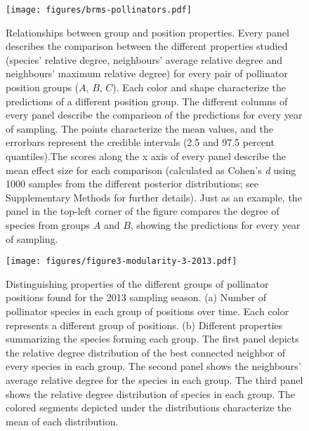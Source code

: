 \documentclass[11pt, a4paper]{article}
\begin{document}
\begin{figure}[ht]
  \centering
    \vspace{0.5cm}
    \texttt{[image: figures/brms-pollinators.pdf]}
        \vspace{0.3cm}
	   \caption[Relationships between group and position properties]{Relationships between group and position properties. Every panel describes the comparison between the different properties studied (species' relative degree, neighbours' average relative degree and neighbours' maximum relative degree) for every pair of pollinator position groups ($A$, $B$, $C$). Each color and shape characterize the predictions of a different position group. The different columns of every panel describe the comparison of the predictions for every year of sampling. The points characterize the mean values, and the errorbars represent the credible intervals (2.5 and 97.5 percent quantiles).The scores along the x axis of every panel describe the mean effect size for each comparison (calculated as Cohen's \textit{d} using 1000 samples from the different posterior distributions; see Supplementary Methods for further details). Just as an example, the panel in the top-left corner of the figure compares the degree of species from groups $A$ and $B$, showing the predictions for every year of sampling.}
      \label{sfig:multivariate}
\end{figure}


\clearpage

\begin{figure}[p]
  \centering
    \vspace{0.5cm}
    \texttt{[image: figures/figure3-modularity-3-2013.pdf]}
	  \vspace{0.3cm}
	   \caption[Distinguishing properties of the different groups of pollinator positions found for the 2013 sampling season]{Distinguishing properties of the different groups of pollinator positions found for the 2013 sampling season. (a) Number of pollinator species in each group of positions over time. Each color represents a different group of positions. (b) Different properties summarizing the species forming each group. The first panel depicts the relative degree distribution of the best connected neighbor of every species in each group. The second panel shows the neighbours' average relative degree for the species in each group. The third panel shows the relative degree distribution of species in each group. The colored segments depicted under the distributions characterize the mean of each distribution.}
      \label{sfig:groups2013}
\end{figure}
\end{document}
